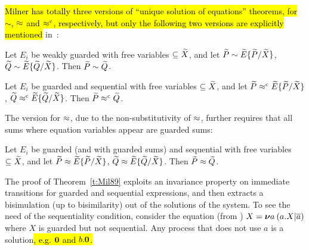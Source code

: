 \hl{Milner has totally three versions of ``unique solution of equations''
theorems, for $\sim$, $\approx$ and $\mathrel{\approx^{\rm{c}}}$, respectively, but only the
following two versions are explicitly mentioned} in~\cite{Mil89}:
\begin{theorem}
\label{t:Mil89s1}
Let $E_i$ be weakly guarded with free variables $\subseteq \widetilde X$,
and let ${\widetilde P} \sim {\widetilde E}\{\widetilde P /\widetilde X\}$,
  ${\widetilde Q} \sim {\widetilde E}\{\widetilde Q /\widetilde X\}$. Then ${\widetilde P} \sim {\widetilde Q}$.
\end{theorem}

\begin{theorem}
\label{t:Mil89s3}
Let $E_i$ be guarded and sequential with free
variables $\subseteq \widetilde X$, and let ${\widetilde P} \mathrel{\approx^{\rm{c}}} {\widetilde E}\{\widetilde P /\widetilde X\}$,
  ${\widetilde Q} \mathrel{\approx^{\rm{c}}} {\widetilde E}\{\widetilde Q /\widetilde X\}$. Then ${\widetilde P} \mathrel{\approx^{\rm{c}}} {\widetilde Q}$.
\end{theorem}

The version for $\approx$, due to the non-substitutivity of $\approx$, further requires
that all sums where equation variables appear are guarded sums:
\begin{theorem}
\label{t:Mil89}
Let $E_i$ be guarded (and with guarded sums) and sequential with free
variables $\subseteq \widetilde X$, and let ${\widetilde P} \approx {\widetilde E}\{\widetilde P /\widetilde X\}$,
  ${\widetilde Q} \approx {\widetilde E}\{\widetilde Q /\widetilde X\}$. Then ${\widetilde P} \approx {\widetilde Q}$.
\end{theorem}

The proof of Theorem~\ref{t:Mil89} exploits an invariance property on immediate transitions for
guarded and sequential expressions, and then extracts a bisimulation
(up to bisimilarity) out
of the solutions of the system.
To see the need of the sequentiality  condition, consider
 the equation (from \cite{Mil89}) $X = {\boldsymbol \nu} a\: (a. X | \overline{a})$
where $X$ is guarded but not sequential. Any process that does not use
$a$ is a solution\hl{, e.g. ${\boldsymbol 0}$ and $b.{\boldsymbol 0}$.}

